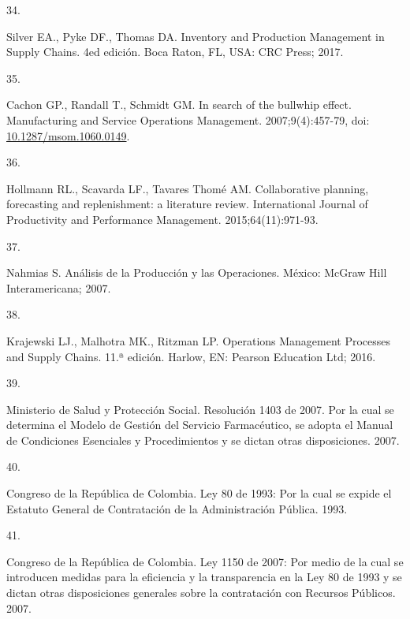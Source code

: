 \documentclass[
]{book}
\newlength{\cslhangindent}
\newlength{\csllabelwidth}
\newlength{\cslentryspacingunit} %
\newenvironment{CSLReferences}[2] %
 {%
  \setlength{\parindent}{0pt}
  \ifodd #1
  \let\oldpar\par
  \def\par{\hangindent=\cslhangindent\oldpar}
  \fi
  \setlength{\parskip}{#2\cslentryspacingunit}
 }%
 {}
\newcommand{\CSLLeftMargin}[1]{\parbox[t]{\csllabelwidth}{#1}}
\newcommand{\CSLRightInline}[1]{\parbox[t]{\linewidth - \csllabelwidth}{#1}\break}
\begin{document}
\begin{CSLReferences}{0}{0}
\leavevmode{}%
\CSLLeftMargin{34. }
\CSLRightInline{Silver EA., Pyke DF., Thomas DA. {Inventory and Production Management in Supply Chains}. 4ed edición. Boca Raton, FL, USA: CRC Press; 2017.}

\leavevmode{}%
\CSLLeftMargin{35. }
\CSLRightInline{Cachon GP., Randall T., Schmidt GM. {In search of the bullwhip effect}. Manufacturing and Service Operations Management. 2007;9(4):457-79, doi: \href{https://doi.org/10.1287/msom.1060.0149}{10.1287/msom.1060.0149}.}

\leavevmode{}%
\CSLLeftMargin{36. }
\CSLRightInline{Hollmann RL., Scavarda LF., Tavares Thomé AM. {Collaborative planning, forecasting and replenishment: a literature review}. International Journal of Productivity and Performance Management. 2015;64(11):971-93.}

\leavevmode{}%
\CSLLeftMargin{37. }
\CSLRightInline{Nahmias S. {An{á}lisis de la Producci{ó}n y las Operaciones}. M{é}xico: McGraw Hill Interamericana; 2007.}

\leavevmode{}%
\CSLLeftMargin{38. }
\CSLRightInline{Krajewski LJ., Malhotra MK., Ritzman LP. {Operations Management Processes and Supply Chains}. 11.ª edición. Harlow, EN: Pearson Education Ltd; 2016.}

\leavevmode{}%
\CSLLeftMargin{39. }
\CSLRightInline{Ministerio de Salud y Protección Social. {Resoluci{ó}n 1403 de 2007. Por la cual se determina el Modelo de Gesti{ó}n del Servicio Farmac{é}utico, se adopta el Manual de Condiciones Esenciales y Procedimientos y se dictan otras disposiciones}. 2007.}

\leavevmode{}%
\CSLLeftMargin{40. }
\CSLRightInline{Congreso de la República de Colombia. {Ley 80 de 1993: Por la cual se expide el Estatuto General de Contrataci{ó}n de la Administraci{ó}n P{ú}blica}. 1993.}

\leavevmode{}%
\CSLLeftMargin{41. }
\CSLRightInline{Congreso de la República de Colombia. {Ley 1150 de 2007: Por medio de la cual se introducen medidas para la eficiencia y la transparencia en la Ley 80 de 1993 y se dictan otras disposiciones generales sobre la contrataci{ó}n con Recursos P{ú}blicos.} 2007.}


\end{CSLReferences}
\end{document}
